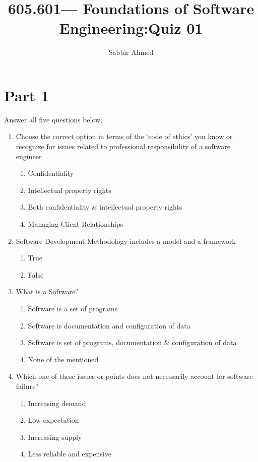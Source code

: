 \documentclass{article}
\newcommand{\answeritem}{\global\answertrue\item}
\newcommand{\perhapsanswer}{%
  \ifanswer
    $\blacksquare$ \global\answerfalse
  \else
    $\square$ \global\answerfalse
  \fi
}
\newif\ifanswer
\begin{document}
  \title{605.601— Foundations of Software Engineering:Quiz 01}
  \author{Sabbir Ahmed}

  \maketitle

  \section*{Part 1} Answer all five questions below.

  \begin{enumerate}

    \item Choose the correct option in terms of the ‘code of ethics’ you know or recognize for issues related to professional responsibility of a software engineer
    \begin{enumerate}[start=1,align=left,label={\protect\perhapsanswer(\alph*)}]
      \item Confidentiality
      \item Intellectual property rights
      \answeritem Both confidentiality \& intellectual property rights
      \item Managing Client Relationships
    \end{enumerate}

    \item Software Development Methodology includes a model and a framework
    \begin{enumerate}[start=1,align=left,label={\protect\perhapsanswer(\alph*)}]
      \answeritem True
      \item False
    \end{enumerate}

    \item What is a Software?
    \begin{enumerate}[start=1,align=left,label={\protect\perhapsanswer(\alph*)}]
      \item Software is a set of programs
      \item Software is documentation and configuration of data
      \answeritem Software is set of programs, documentation \& configuration of data
      \item None of the mentioned
    \end{enumerate}

    \item Which one of these issues or points does not necessarily account for software failure?
    \begin{enumerate}[start=1,align=left,label={\protect\perhapsanswer(\alph*)}]
      \item Increasing demand
      \answeritem Low expectation
      \item Increasing supply
      \item Less reliable and expensive
    \end{enumerate}


\end{enumerate}
\end{document}
